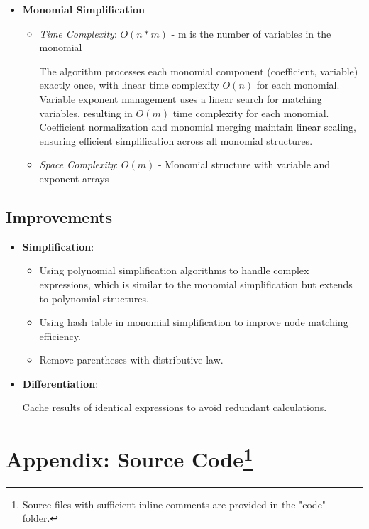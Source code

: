 \documentclass{report}
\begin{document}
\begin{itemize}
    \item \textbf{Monomial Simplification}
    \begin{itemize}
        \item \textit{Time Complexity}: $O(n*m)$ - m is the number of variables in the monomial
        
        The algorithm processes each monomial component (coefficient, variable) exactly once, with linear time complexity \(O(n)\) for each monomial. Variable exponent management uses a linear search for matching variables, resulting in \(O(m)\) time complexity for each monomial. Coefficient normalization and monomial merging maintain linear scaling, ensuring efficient simplification across all monomial structures.
        \item \textit{Space Complexity}: $O(m)$ - Monomial structure with variable and exponent arrays
    \end{itemize}

\end{itemize}

\section*{Improvements}
\begin{itemize}
    \item \textbf{Simplification}:
    \begin{itemize}
        \item Using polynomial simplification algorithms to handle complex expressions, which is similar to the monomial simplification but extends to polynomial structures.
        \item Using hash table in monomial simplification to improve node matching efficiency.
        \item Remove parentheses with distributive law.
    \end{itemize}
    \item \textbf{Differentiation}:
    
    Cache results of identical expressions to avoid redundant calculations.
\end{itemize}


\chapter*{Appendix: Source Code\footnote{Source files with sufficient inline comments are provided in the "code" folder.}}
\end{document}
